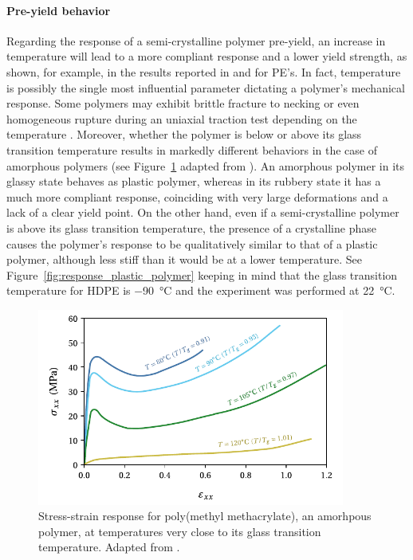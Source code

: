 \paragraph{Pre-yield behavior}
Regarding the response of a semi-crystalline polymer pre-yield, an increase in temperature will lead to a more compliant response and a lower yield strength, as shown, for example, in the results reported in \cite{brownInfluenceMolecularConformation2007} and \cite{hobeikaTemperatureStrainRate2000} for PE's.
In fact, temperature is possibly the single most influential parameter dictating a polymer's mechanical response.
Some polymers may exhibit brittle fracture to necking or even homogeneous rupture during an uniaxial traction test depending on the temperature \citep{wardIntroductionMechanicalProperties2004}.
Moreover, whether the polymer is below or above its glass transition temperature results in markedly different behaviors in the case of amorphous polymers (see Figure~\ref{fig:scheme_effect_temperature} adapted from \cite{vanloockDeformationFailureMaps2018}).
An amorphous polymer in its glassy state behaves as plastic polymer, whereas in its rubbery state it has a much more compliant response, coinciding with very large deformations and a lack of a clear yield point.
On the other hand, even if a semi-crystalline polymer is above its glass transition temperature, the presence of a crystalline phase causes the polymer's response to be qualitatively similar to that of a plastic polymer, although less stiff than it would be at a lower temperature.
See Figure~\ref{fig:response_plastic_polymer} keeping in mind that the glass transition temperature for HDPE is \SI{-90}{\celsius}  \citep{callister2014materials} and the experiment was performed at \SI{22}{\celsius}.
\begin{figure}[hbtp]
	\centering
	\includegraphics[width=0.9\textwidth]{figures/scheme_effect_temperature}
	\caption{Stress-strain response for poly(methyl methacrylate), an amorhpous polymer, at temperatures very close to its glass transition temperature. Adapted from \cite{vanloockDeformationFailureMaps2018}.}
\label{fig:scheme_effect_temperature}
\end{figure}

